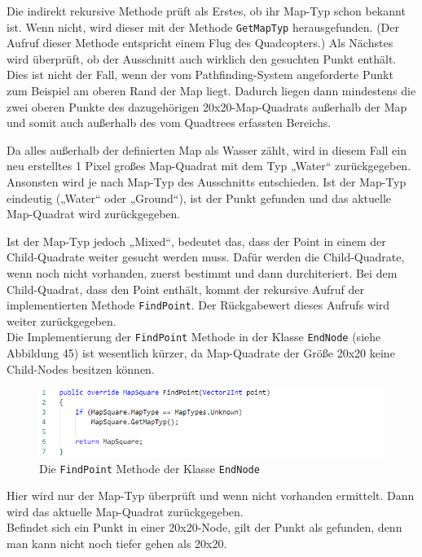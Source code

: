 \documentclass[a4paper,12pt]{article}
\newcommand{\code}{\texttt}
\begin{document}
Die indirekt rekursive Methode prüft als Erstes, ob ihr Map-Typ schon bekannt ist. Wenn nicht, wird dieser mit der Methode \code{GetMapTyp} herausgefunden. (Der Aufruf dieser Methode entspricht einem Flug des Quadcopters.) Als Nächstes wird überprüft, ob der Ausschnitt auch wirklich den gesuchten Punkt enthält. Dies ist nicht der Fall, wenn der vom Pathfinding-System angeforderte Punkt zum Beispiel am oberen Rand der Map liegt. Dadurch liegen dann mindestens die zwei oberen Punkte des dazugehörigen 20x20-Map-Quadrats außerhalb der Map und somit auch außerhalb des vom Quadtrees erfassten Bereichs.

Da alles außerhalb der definierten Map als Wasser zählt, wird in diesem Fall ein neu erstelltes 1 Pixel großes Map-Quadrat mit dem Typ „Water“ zurückgegeben.
\\[0.4cm]
Ansonsten wird je nach Map-Typ des Ausschnitts entschieden. Ist der Map-Typ eindeutig („Water“ oder „Ground“), ist der Punkt gefunden und das aktuelle Map-Quadrat wird zurückgegeben.

Ist der Map-Typ jedoch „Mixed“, bedeutet das, dass der Point in einem der Child-Quadrate weiter gesucht werden muss. Dafür werden die Child-Quadrate, wenn noch nicht vorhanden, zuerst bestimmt und dann durchiteriert. Bei dem Child-Quadrat, dass den Point enthält, kommt der rekursive Aufruf der implementierten Methode \code{FindPoint}. Der Rückgabewert dieses Aufrufs wird weiter zurückgegeben.
\\[0.4cm]
Die Implementierung der \code{FindPoint} Methode in der Klasse \code{EndNode} (siehe Abbildung 45) ist wesentlich kürzer, da Map-Quadrate der Größe 20x20 keine Child-Nodes besitzen können.

\begin{figure}[H]
    \centering
    \includegraphics[width=1\linewidth]{Bilder/Aufgabe3/Teilaufgabe_C/Quadtree_03.png}
    \caption{Die \code{FindPoint} Methode der Klasse \code{EndNode}}
\end{figure}

Hier wird nur der Map-Typ überprüft und wenn nicht vorhanden ermittelt. Dann wird das aktuelle Map-Quadrat zurückgegeben.
\\[0.4cm]
Befindet sich ein Punkt in einer 20x20-Node, gilt der Punkt als gefunden, denn man kann nicht noch tiefer gehen als 20x20.
\end{document}
